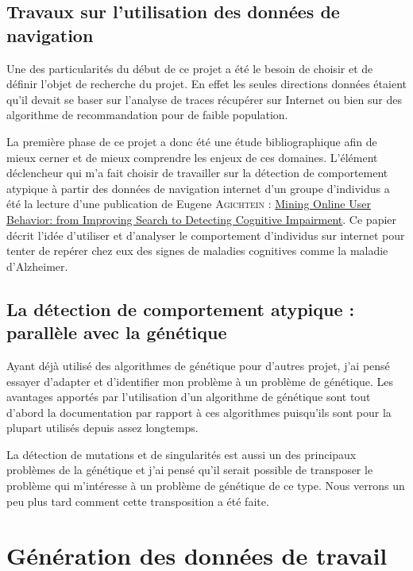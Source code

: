 \documentclass[a4paper, 11pt]{article}
\begin{document}
\subsection{Travaux sur l'utilisation des données de navigation}
Une des particularités du début de ce projet a été le besoin de choisir et de définir l'objet de recherche du projet. En effet les seules directions données étaient qu'il devait se baser sur l'analyse de traces récupérer sur Internet ou bien sur des algorithme de recommandation pour de faible population.

La première phase de ce projet a donc été une étude bibliographique afin de mieux cerner et de mieux comprendre les enjeux de ces domaines. L'élément déclencheur qui m'a fait choisir de travailler sur la détection de comportement atypique à partir des données de navigation internet d'un groupe d'individus a été la lecture d'une publication de Eugene A\textsc{gichtein} : \href{http://www.cse.lehigh.edu/academics/graduate-programs/graduate-computer-engineering/2-uncategorised/235-agichtein}{Mining Online User Behavior: from Improving Search to Detecting Cognitive Impairment}. Ce papier décrit l'idée d'utiliser et d'analyser le comportement d'individus sur internet pour tenter de repérer chez eux des signes de maladies cognitives comme la maladie d'Alzheimer.

\subsection{La détection de comportement atypique : parallèle avec la génétique}

Ayant déjà utilisé des algorithmes de génétique pour d'autres projet, j'ai pensé essayer d'adapter et d'identifier mon problème à un problème de génétique. Les avantages apportés par l'utilisation d'un algorithme de génétique sont tout d'abord la documentation par rapport à ces algorithmes puisqu'ils sont pour la plupart utilisés depuis assez longtemps. 

La détection de mutations et de singularités est aussi un des principaux problèmes de la génétique et j'ai pensé qu'il serait possible de transposer le problème qui m'intéresse à un problème de génétique de ce type. Nous verrons un peu plus tard comment cette transposition a été faite.

\section{Génération des données de travail}
\end{document}
